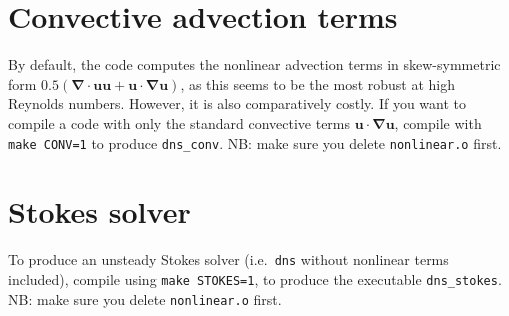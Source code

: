 \documentclass[11pt,a4paper]{report}
\begin{document}
\section{Convective advection terms}

By default, the code computes the nonlinear advection terms in
skew-symmetric form $0.5(\bm{\nabla\cdot u u}+\bm{u\cdot\nabla u})$,
as this seems to be the most robust at high Reynolds numbers. However,
it is also comparatively costly. If you want to compile a code with
only the standard convective terms $\bm{u\cdot\nabla u}$, compile with
\verb+make CONV=1+ to produce \verb+dns_conv+.  NB: make sure you
delete \verb+nonlinear.o+ first.

\section{Stokes solver}

To produce an unsteady Stokes solver (i.e.\ \verb+dns+ without
nonlinear terms included), compile using \verb+make STOKES=1+, to
produce the executable \verb+dns_stokes+.  NB: make sure you delete
\verb+nonlinear.o+ first.





\end{document}
